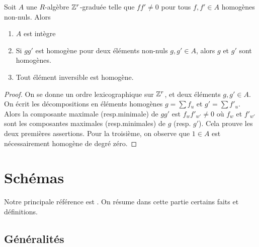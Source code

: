 \begin{prop}\label{GradedProp1}
Soit $A$ une $R$-algèbre $\mathbb{Z}^r$-graduée telle que $ff'\neq 0$ pour tous $f,f'\in A$ homogènes non-nuls. Alors
\begin{enumerate}
\item $A$ est intègre
\item Si $gg'$ est homogène pour deux éléments non-nuls $g,g'\in A$, alors $g$ et $g'$ sont homogènes.
\item Tout élément inversible est homogène.
\end{enumerate}
\end{prop}
\begin{proof}
On se donne un ordre lexicographique sur $\mathbb{Z}^r$, et deux éléments $g,g'\in A$. On écrit les décompositions en éléments homogènes $g=\sum f_u$ et $g'=\sum f'_u$. Alors la composante maximale (resp.minimale) de $gg'$ est $f_wf'_{w'}\neq 0$ où $f_w$ et $f'_{w'}$ sont les composantes maximales (resp.minimales) de $g$ (resp. $g'$). Cela prouve les deux premières assertions. Pour la troisième, on observe que $1\in A$ est nécessairement homogène de degré zéro.
\end{proof}



\section{Schémas}

\noindent Notre principale référence est \cite{Hartshorne}. On résume dans cette partie certains faits et définitions. 

\subsection{Généralités}

